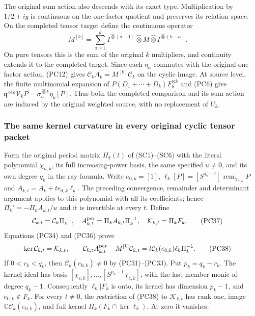 The original sum action also descends with its exact type.  Multiplication
by $1/2+iy$ is continuous on the one-factor quotient and preserves its
relation space.  On the completed tensor target define the continuous
operator
\[
 M^{[k]}=\sum_{a=1}^k
       I^{\widehat\otimes(a-1)}\widehat\otimes M
                         \widehat\otimes I^{\widehat\otimes(k-a)}.
 \tag{PC36}
\]
On pure tensors this is the sum of the original $k$ multipliers,
and continuity extends it to the completed target.  Since each
$\eta_h$ commutes with the original one-factor action, (PC12)
gives $\mathcal C_kA_k=M^{[k]}\mathcal C_k$ on the cyclic image.
At source level, the finite multinomial expansion of
$P(D_1+\cdots+D_k)F_h^{\otimes k}$ and (PC6) give
$\mathsf q^{\widehat\otimes k}\mathcal V_kP
=\sigma_h^{\widehat\otimes k}\eta_k[P]$.
Thus both the completed comparison and its sum action are induced
by the original weighted source, with no replacement of $U_k$.

\subsubsection{The same kernel curvature in every original cyclic tensor packet}

Form the original period matrix $\Pi_k(t)$ of (SC1)--(SC6) with
the literal polynomial $\chi_{h,k}$, its full increasing-power basis,
the same specified $u\ne0$, and its own degree $q_k$ in the ray
formula.  Write $e_{0,k}=[1]$,
$\ell_k[P]=[S^{q_k-1}]\operatorname{rem}_{\chi_{h,k}}P$ and
$A_{k,t}=A_k+t e_{0,k}\ell_k$.  The preceding convergence,
remainder and determinant argument applies to this polynomial with
all its coefficients; hence $\Pi_k'=-\Pi_kA_{k,t}/u$ and it is
invertible at every $t$.  Define
\[
 \mathcal C_{k,t}=\mathcal C_k\Pi_k^{-1},\quad
 A_{k,t}^{\rm per}=\Pi_kA_{k,t}\Pi_k^{-1},\quad
 \mathcal K_{k,t}=\Pi_k F_k.
 \tag{PC37}
\]
Equations (PC34) and (PC36) prove
\[
 \ker\mathcal C_{k,t}=\mathcal K_{k,t},\qquad
 \mathcal C_{k,t}A_{k,t}^{\rm per}-M^{[k]}\mathcal C_{k,t}
       =t\mathcal C_k(e_{0,k})\ell_k\Pi_k^{-1}.
 \tag{PC38}
\]
If $0<r_k<q_k$, then $\mathcal C_k(e_{0,k})\ne0$ by
(PC31)--(PC33).  Put $p_k=q_k-r_k$.  The kernel ideal has basis
$[\chi_{c,k}],\ldots,[S^{p_k-1}\chi_{c,k}]$, with the last
member monic of degree $q_k-1$.  Consequently $\ell_k|F_k$ is
onto, its kernel has dimension $p_k-1$, and $e_{0,k}\notin F_k$.
For every $t\ne0$, the restriction of (PC38) to $\mathcal K_{k,t}$
has rank one, image $\mathbb C\mathcal C_k(e_{0,k})$, and full
kernel $\Pi_k(F_k\cap\ker\ell_k)$.  At zero it vanishes.

